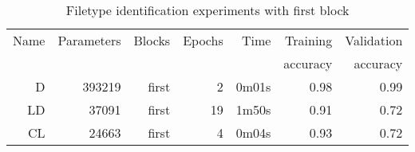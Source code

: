\begin{table}[!ht]
    \centering
    \caption{Filetype identification experiments with first block}
    \label{tab:carving7-11}
\begin{tabular}{r|r|r|r|r|r|r}
\hline
Name & Parameters & Blocks & Epochs & Time    & Training          & Validation          \\       
     &            &        &        &         &          accuracy &            accuracy \\ \hline\hline

D    & 393219     & first  & 2      & 0m01s   & 0.98              & 0.99                \\ \hline
LD   & 37091      & first  & 19     & 1m50s   & 0.91              & 0.72                \\ \hline
CL   & 24663      & first  & 4      & 0m04s   & 0.93              & 0.72                \\ \hline
\end{tabular}
\end{table}